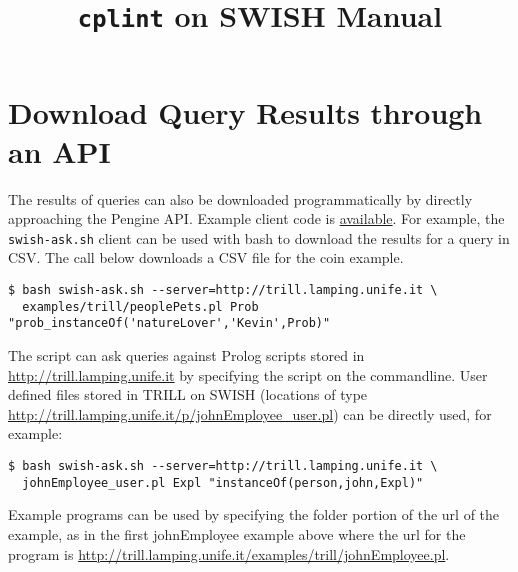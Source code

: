 \documentclass[a4paper,10pt]{scrartcl}
\begin{document}
\title{\texttt{cplint} on SWISH Manual}
\maketitle

%







\section{Download Query Results through an API}
The results of queries can also be downloaded programmatically by directly
approaching the Pengine API. Example client code is 
\href{https://github.com/friguzzi/trill-on-swish/tree/master/client}{available}.  For example, the \verb|swish-ask.sh| client
can be used with bash to download the results for a query in CSV.  The call
below downloads a CSV file for the coin example.
\begin{verbatim}
$ bash swish-ask.sh --server=http://trill.lamping.unife.it \
  examples/trill/peoplePets.pl Prob "prob_instanceOf('natureLover','Kevin',Prob)"
\end{verbatim}
The script can ask queries against Prolog scripts stored in 
\url{http://trill.lamping.unife.it} by specifying
the script on the commandline.  User defined files stored
in TRILL on SWISH (locations of type
\url{http://trill.lamping.unife.it/p/johnEmployee_user.pl}) can
be directly used, for example:
\begin{verbatim}
$ bash swish-ask.sh --server=http://trill.lamping.unife.it \
  johnEmployee_user.pl Expl "instanceOf(person,john,Expl)"
\end{verbatim}
Example programs can be used by specifying the folder portion of the url of the example,
as in the first johnEmployee example above where the url for the program is 
\url{http://trill.lamping.unife.it/examples/trill/johnEmployee.pl}.
\end{document}
